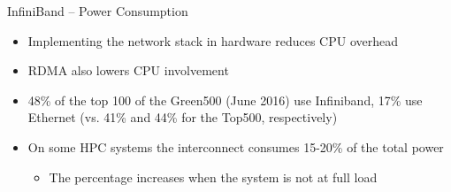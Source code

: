 \documentclass{beamer}
\begin{document}
\begin{frame}{InfiniBand – Power Consumption}
\begin{itemize}
	\item Implementing the network stack in hardware reduces CPU overhead
	\item RDMA also lowers CPU involvement
	\item 48\% of the top 100 of the Green500 (June 2016) use Infiniband, 17\% use Ethernet (vs. 41\% and 44\% for the Top500, respectively)
	\item On some HPC systems the interconnect consumes 15-20\% of the total power
	\begin{itemize}
		\item The percentage increases when the system is not at full load
	\end{itemize}
\end{itemize}
\end{frame}


\end{document}
